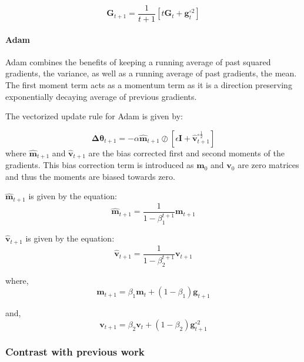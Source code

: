 \documentclass{article}
\begin{document}
\begin{equation}
\boldsymbol{G}_{t+1} = \frac{1}{t+1}[t\boldsymbol{G}_{t} + \boldsymbol{g}_{t}^{\circ{2}}]
\end{equation}
\paragraph{Adam}
Adam combines the benefits of keeping a running average of past squared gradients, the variance, as well as a running average of past gradients, the mean. The first moment term acts as a momentum term as it is a direction preserving exponentially decaying average of previous gradients.

The vectorized update rule for Adam is given by:

\begin{equation}
\boldsymbol{\Delta{\theta}}_{t+1} = -\alpha\boldsymbol{\hat{m}}_{t+1}\oslash{[\epsilon\boldsymbol{I} +\boldsymbol{\hat{v}}_{t+1}^{\circ\frac{1}{2}}]}
\end{equation}
where $\boldsymbol{\hat{m}}_{t+1}$ and $\boldsymbol{\hat{v}}_{t+1}$ are the bias corrected first and second moments of the gradients. This bias correction term is introduced as $\boldsymbol{m}_0$ and $\boldsymbol{v}_0$ are zero matrices and thus the moments are biased towards zero.

$\boldsymbol{\hat{m}}_{t+1}$ is given by the equation:
\begin{equation}
\boldsymbol{\hat{m}}_{t+1} = \frac{1}{1-\beta_1^{t+1}}\boldsymbol{m}_{t+1}
\end{equation}

$\boldsymbol{\hat{v}}_{t+1}$ is given by the equation:
\begin{equation}
\boldsymbol{\hat{v}}_{t+1} = \frac{1}{1-\beta_2^{t+1}}\boldsymbol{v}_{t+1}
\end{equation}

where,
\begin{equation}
\boldsymbol{m}_{t+1} = \beta_1\boldsymbol{m}_{t} + (1-\beta_1)\boldsymbol{g}_{t+1}
\end{equation}

and,
\begin{equation}
\boldsymbol{v}_{t+1} = \beta_2\boldsymbol{v}_{t} + (1-\beta_2)\boldsymbol{g}_{t+1}^{\circ2}
\end{equation}
\subsubsection{Contrast with previous work}
\end{document}
